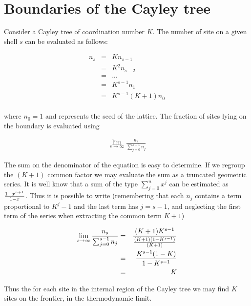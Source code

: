 \chapter{Boundaries of the Cayley tree}

Consider a Cayley tree of coordination number $K$. The number of site on a given shell $s$ can be evaluated as follows:

\begin{eqnarray}
n_{s} &=& Kn_{s-1} \nonumber\\
      &=& K^2n_{s-2} \nonumber\\
		&=& ... \nonumber\\
		&=& K^{s-1}n_1 \nonumber\\
		&=& K^{s-1}(K+1)n_0 \nonumber\\
\end{eqnarray}

where $n_0=1$ and represents the seed of the lattice. The fraction of sites lying on the boundary is evaluated using

\begin{eqnarray}
\lim_{s\rightarrow\infty} \frac{n_{s}}{\sum_{j=0}^{s-1} n_{j}}
\end{eqnarray}

The sum on the denominator of the equation is easy to determine. If we regroup the $(K+1)$ common factor we may evaluate the sum as a truncated geometric series. It is well know that a sum of the type $\sum_{j=0}^n x^j$ can be estimated as $ {1-x^{n+1} \over 1 - x} $. Thus it is possible to write (remembering that each $n_j$ contains a term proportional to $K^j-1$ and the last term has $j=s-1$, and neglecting the first term of the series when extracting the common term $K+1$)

\begin{eqnarray}
\lim_{s\rightarrow\infty} \frac{n_{s}}{\sum_{j=0}^{s-1} n_{j}} &=&  {(K+1)K^{s-1}\over
{(K+1)(1-K^{s-1}) \over (K+1)}} \nonumber \\
                                                               &=&  {K^{s-1}(1-K)  \over 1-K^{s-1}} \nonumber \\
                                                               &=&   K \nonumber
\end{eqnarray}

Thus the for each site in the internal region of the Cayley tree we may find $K$ sites on the frontier, in the thermodynamic limit.


